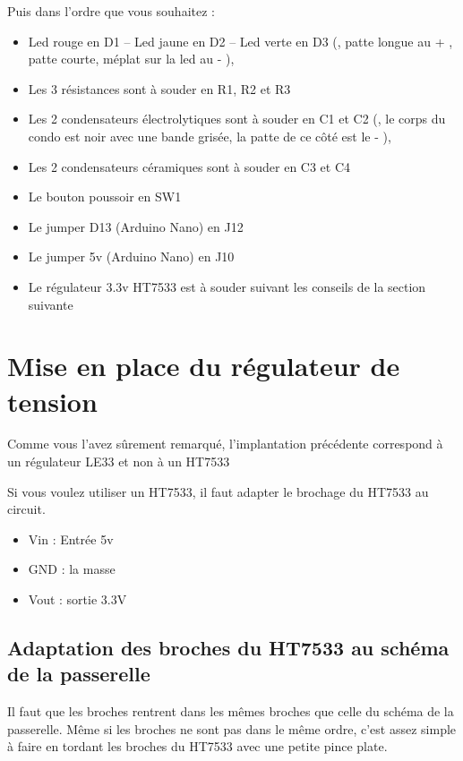 Puis dans l'ordre que vous souhaitez : 
\begin{itemize}
    \item Led rouge en D1 – Led jaune en D2 – Led verte en D3 ({\color{red}{sont polarisées}}, patte longue au + ,  patte courte, méplat sur la led au - ),
    \item Les 3 résistances sont à souder en R1, R2 et R3
    \item Les 2 condensateurs électrolytiques sont à souder en C1 et C2 ({\color{red}{sont polarisées}}, le corps du condo est noir avec une bande grisée, la patte de ce côté est le - ),
    \item Les 2 condensateurs céramiques sont à souder en C3 et C4
    \item Le bouton poussoir en SW1
    \item Le jumper D13 (Arduino Nano) en J12
    \item Le jumper 5v (Arduino Nano) en J10
    \item Le régulateur 3.3v HT7533 est à souder suivant les conseils de la section suivante
\end{itemize}

\section{Mise en place du régulateur de tension}

Comme vous l'avez sûrement remarqué, l'implantation précédente correspond à un régulateur LE33 et non à un HT7533

Si vous voulez utiliser un HT7533, il faut adapter le brochage du HT7533 au circuit.

\begin{itemize}
    \item Vin : Entrée 5v
    \item GND : la masse
    \item Vout : sortie 3.3V
\end{itemize}


\subsection{Adaptation des broches du HT7533 au schéma de la passerelle}

Il faut que les broches  rentrent dans les mêmes broches que celle du schéma de la passerelle. Même si les broches ne sont pas dans le même ordre, c'est assez simple à faire en tordant les broches du HT7533 avec une petite pince plate.\\

